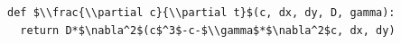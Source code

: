 \documentclass[border=10pt]{standalone}
\begin{document}
\begin{lstlisting}
def $\\frac{\\partial c}{\\partial t}$(c, dx, dy, D, gamma):
  return D*$\nabla^2$(c$^3$-c-$\\gamma$*$\nabla^2$c, dx, dy)
\end{lstlisting}
\end{document}
